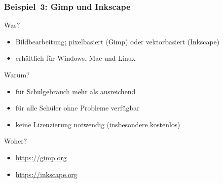\documentclass{beamer}
\begin{document}
\begin{frame}
  \frametitle{Beispiel~3: Gimp und Inkscape}

  \onslide<+->

  \begin{block}{Was?}
    \begin{itemize}
    \item Bildbearbeitung; pixelbasiert (Gimp) oder vektorbasiert (Inkscape)
    \item erhältlich für Windows, Mac und Linux
    \end{itemize}
  \end{block}

  \onslide<+->

  \begin{block}{Warum?}
    \begin{itemize}
    \item für Schulgebrauch mehr als ausreichend
    \item für alle Schüler ohne Probleme verfügbar
    \item keine Lizenzierung notwendig (insbesondere kostenlos)
    \end{itemize}
  \end{block}

  \onslide<+->

  \begin{block}{Woher?}
    \begin{itemize}
    \item \url{https://gimp.org}
    \item \url{https://inkscape.org}
    \end{itemize}
  \end{block}


\end{frame}
\end{document}
